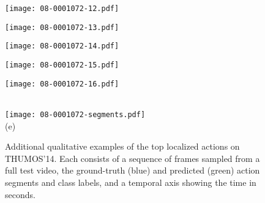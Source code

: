 \documentclass[10pt,twocolumn,letterpaper]{article}
\begin{document}
\begin{figure*}[t]
 \begin{minipage}{0.058\textwidth} \centering \texttt{[image: 08-0001072-12.pdf]} \end{minipage}
 \begin{minipage}{0.058\textwidth} \centering \texttt{[image: 08-0001072-13.pdf]} \end{minipage}
 \begin{minipage}{0.058\textwidth} \centering \texttt{[image: 08-0001072-14.pdf]} \end{minipage}
 \begin{minipage}{0.058\textwidth} \centering \texttt{[image: 08-0001072-15.pdf]} \end{minipage}
 \begin{minipage}{0.058\textwidth} \centering \texttt{[image: 08-0001072-16.pdf]} \end{minipage}
 \\ \vspace{2mm}
 \texttt{[image: 08-0001072-segments.pdf]}
 \\
 (e)
\caption{\small Additional qualitative examples of the top localized actions
on THUMOS'14. Each consists of a sequence of frames sampled from a full test
video, the ground-truth (blue) and predicted (green) action segments and class
labels, and a temporal axis showing the time in seconds.}
 \label{fig:additional-1}
\end{figure*}
\end{document}
